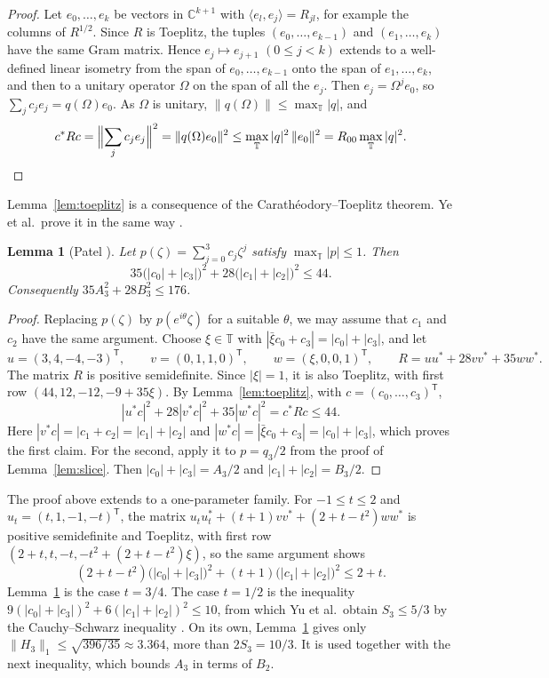 \documentclass[11pt]{amsart}
\newtheorem{lemma}[theorem]{Lemma}
\theoremstyle{remark}
\numberwithin{equation}{section}
\newcommand{\C}{\mathbb{C}}
\newcommand{\T}{\mathbb{T}}
\begin{document}
\begin{proof}
Let $e_0,\dots,e_k$ be vectors in $\C^{k+1}$ with $\langle e_l,e_j\rangle=R_{jl}$, for example the columns of $R^{1/2}$. Since $R$ is Toeplitz, the tuples $(e_0,\dots,e_{k-1})$ and $(e_1,\dots,e_k)$ have the same Gram matrix. Hence $e_j\mapsto e_{j+1}$ $(0\le j<k)$ extends to a well-defined linear isometry from the span of $e_0,\dots,e_{k-1}$ onto the span of $e_1,\dots,e_k$, and then to a unitary operator $\Omega$ on the span of all the $e_j$. Then $e_j=\Omega^je_0$, so $\sum_jc_je_j=q(\Omega)e_0$. As $\Omega$ is unitary, $\|q(\Omega)\|\le\max_\T|q|$, and
\[
c^*Rc=\Bigl\|\sum_jc_je_j\Bigr\|^2=\|q(\Omega)e_0\|^2\le\max_\T|q|^2\,\|e_0\|^2=R_{00}\max_\T|q|^2.\qedhere
\]
\end{proof}

Lemma~\ref{lem:toeplitz} is a consequence of the Carath\'eodory--Toeplitz theorem. Ye et al.\ prove it in the same way \cite[Lemma~3.1]{Ye26}.

\begin{lemma}[Patel {\cite{PatMDB}}]\label{lem:cubic}
Let $p(\zeta)=\sum_{j=0}^3c_j\zeta^j$ satisfy $\max_\T|p|\le1$. Then
\[
35\bigl(|c_0|+|c_3|\bigr)^2+28\bigl(|c_1|+|c_2|\bigr)^2\le44.
\]
Consequently $35A_3^2+28B_3^2\le176$.
\end{lemma}

\begin{proof}
Replacing $p(\zeta)$ by $p(e^{i\theta}\zeta)$ for a suitable $\theta$, we may assume that $c_1$ and $c_2$ have the same argument. Choose $\xi\in\T$ with $|\bar\xi c_0+c_3|=|c_0|+|c_3|$, and let
\[
u=(3,4,-4,-3)^{\mathsf T},\qquad v=(0,1,1,0)^{\mathsf T},\qquad w=(\xi,0,0,1)^{\mathsf T},\qquad R=uu^*+28vv^*+35ww^*.
\]
The matrix $R$ is positive semidefinite. Since $|\xi|=1$, it is also Toeplitz, with first row $(44,12,-12,-9+35\xi)$. By Lemma~\ref{lem:toeplitz}, with $c=(c_0,\dots,c_3)^{\mathsf T}$,
\[
|u^*c|^2+28|v^*c|^2+35|w^*c|^2=c^*Rc\le44.
\]
Here $|v^*c|=|c_1+c_2|=|c_1|+|c_2|$ and $|w^*c|=|\bar\xi c_0+c_3|=|c_0|+|c_3|$, which proves the first claim. For the second, apply it to $p=q_3/2$ from the proof of Lemma~\ref{lem:slice}. Then $|c_0|+|c_3|=A_3/2$ and $|c_1|+|c_2|=B_3/2$.
\end{proof}

The proof above extends to a one-parameter family. For $-1\le t\le2$ and $u_t=(t,1,-1,-t)^{\mathsf T}$, the matrix $u_tu_t^*+(t+1)vv^*+(2+t-t^2)ww^*$ is positive semidefinite and Toeplitz, with first row $(2+t,t,-t,-t^2+(2+t-t^2)\xi)$, so the same argument shows
\[
(2+t-t^2)\bigl(|c_0|+|c_3|\bigr)^2+(t+1)\bigl(|c_1|+|c_2|\bigr)^2\le2+t.
\]
Lemma~\ref{lem:cubic} is the case $t=3/4$. The case $t=1/2$ is the inequality $9(|c_0|+|c_3|)^2+6(|c_1|+|c_2|)^2\le10$, from which Yu et al.\ obtain $S_3\le5/3$ by the Cauchy--Schwarz inequality \cite[(6)]{Yu26}. On its own, Lemma~\ref{lem:cubic} gives only $\|H_3\|_1\le\sqrt{396/35}\approx3.364$, more than $2S_3=10/3$. It is used together with the next inequality, which bounds $A_3$ in terms of $B_2$.
\end{document}
